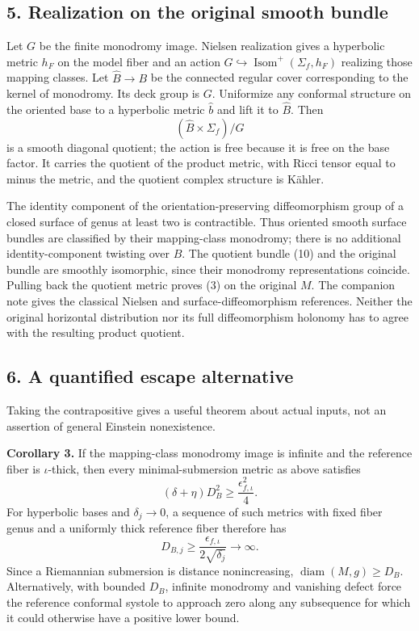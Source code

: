 \documentclass[
  11pt,
]{article}
\begin{document}
\hypertarget{realization-on-the-original-smooth-bundle}{%
\subsection{5. Realization on the original smooth
bundle}\label{realization-on-the-original-smooth-bundle}}

Let \(G\) be the finite monodromy image. Nielsen realization gives a
hyperbolic metric \(h_F\) on the model fiber and an action
\(G\hookrightarrow\operatorname{Isom}^+(\Sigma_f,h_F)\) realizing those
mapping classes. Let \(\widehat B\to B\) be the connected regular cover
corresponding to the kernel of monodromy. Its deck group is \(G\).
Uniformize any conformal structure on the oriented base to a hyperbolic
metric \(\widehat b\) and lift it to \(\widehat B\). Then \[
          (\widehat B\times\Sigma_f)/G                     \tag{10}
\] is a smooth diagonal quotient; the action is free because it is free
on the base factor. It carries the quotient of the product metric, with
Ricci tensor equal to minus the metric, and the quotient complex
structure is Kähler.

The identity component of the orientation-preserving diffeomorphism
group of a closed surface of genus at least two is contractible. Thus
oriented smooth surface bundles are classified by their mapping-class
monodromy; there is no additional identity-component twisting over
\(B\). The quotient bundle (10) and the original bundle are smoothly
isomorphic, since their monodromy representations coincide. Pulling back
the quotient metric proves (3) on the original \(M\). The companion note
gives the classical Nielsen and surface-diffeomorphism references.
Neither the original horizontal distribution nor its full diffeomorphism
holonomy has to agree with the resulting product quotient.

\hypertarget{a-quantified-escape-alternative}{%
\subsection{6. A quantified escape
alternative}\label{a-quantified-escape-alternative}}

Taking the contrapositive gives a useful theorem about actual inputs,
not an assertion of general Einstein nonexistence.

\textbf{Corollary 3.} If the mapping-class monodromy image is infinite
and the reference fiber is \(\iota\)-thick, then every
minimal-submersion metric as above satisfies \[
          (\delta+\eta)D_B^2\ge\frac{\epsilon_{f,\iota}^2}{4}.
                                                               \tag{11}
\] For hyperbolic bases and \(\delta_j\to0\), a sequence of such metrics
with fixed fiber genus and a uniformly thick reference fiber therefore
has \[
          D_{B,j}\ge\frac{\epsilon_{f,\iota}}{2\sqrt{\delta_j}}
                   \longrightarrow\infty.                  \tag{12}
\] Since a Riemannian submersion is distance nonincreasing,
\(\operatorname{diam}(M,g)\ge D_B\). Alternatively, with bounded
\(D_B\), infinite monodromy and vanishing defect force the reference
conformal systole to approach zero along any subsequence for which it
could otherwise have a positive lower bound.
\end{document}
